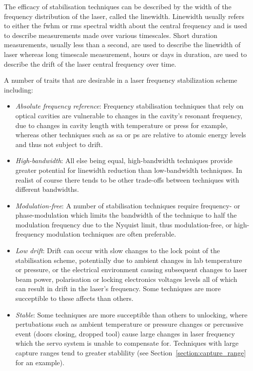 The efficacy of stabilisation techniques can be described by the width of the frequency distribution of the laser, called the linewidth.
Linewidth usually refers to either the \gls{fwhm} or \gls{rms} spectral width about the central frequency and is used to describe measurements made over various timescales.
Short duration measurements, usually less than a second, are used to describe the linewidth of laser whereas long timescale measurement, hours or days in duration, are used to describe the drift of the laser central frequency over time.

A number of traits that are desirable in a laser frequency stabilization scheme including:
\begin{itemize}
    \item \emph{Absolute frequency reference}: Frequency stabilisation techniques that rely on optical cavities are vulnerable to changes in the cavity's resonant frequency, due to changes in cavity length with temperature or press for example, whereas other techniques such as \gls{sa} or \gls{ps} are relative to atomic energy levels and thus not subject to drift.
    \item \emph{High-bandwidth}: All else being equal, high-bandwidth techniques provide greater potential for linewidth reduction than low-bandwidth techniques. In realist of course there tends to be other trade-offs between techniques with different bandwidths.
    \item \emph{Modulation-free}: A number of stabilisation techniques require frequency- or phase-modulation which limits the bandwidth of the technique to half the modulation frequency due to the Nyquist limit, thus modulation-free, or high-frequency modulation techniques are often preferable.
    \item \emph{Low drift}: Drift can occur with slow changes to the lock point of the stabilisation scheme, potentially due to ambient changes in lab temperature or pressure, or the electrical environment causing subsequent changes to laser beam power, polarisation or locking electronics voltages levels all of which can result in drift in the laser's frequency. Some techniques are more succeptible to these affects than others.
    \item \emph{Stable}: Some techniques are more succeptible than others to unlocking, where pertubations such as ambient temperature or pressure changes or percussive event (doors closing, dropped tool) cause large changes in laser frequency which the servo system is unable to compensate for. Techniques with large capture ranges tend to greater stablility (see Section~\ref{section:capture_range} for an example).
\end{itemize}

